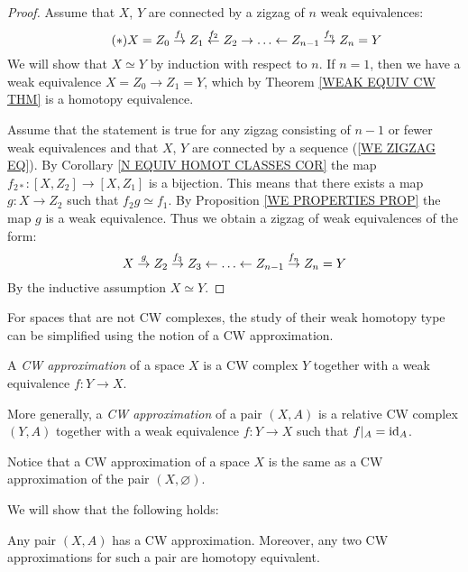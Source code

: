 \begin{proof}
Assume that $X$, $Y$ are connected by a zigzag of $n$ weak equivalences:
\begin{equation*}
\label{WE ZIGZAG EQ}
\tag{$\ast$}
X = Z_{0} \overset{f_{1}}{\ra} Z_{1} 
\overset{f_{2}}{\la} Z_{2} \ra \dots 
\la Z_{n-1} \overset{f_{n}}{\ra} Z_{n} = Y
\end{equation*}
We will show that $X\simeq Y$ by induction with respect to $n$. 
If $n=1$, then we have a weak equivalence $X=Z_{0} \to Z_{1} = Y$, which 
by Theorem \ref{WEAK EQUIV CW THM} is a homotopy equivalence. 

Assume that the statement is true for any zigzag consisting of $n-1$ or fewer weak 
equivalences and that $X$, $Y$ are connected by a sequence (\ref{WE ZIGZAG EQ}). 
By Corollary \ref{N EQUIV HOMOT CLASSES COR}
the map $f_{2\ast}\colon [X, Z_{2}]\to [X, Z_{1}]$ is a bijection. This means
that there exists a map $g\colon X \to Z_{2}$ such that $f_{2}g \simeq f_{1}$.
By Proposition \ref{WE PROPERTIES PROP} the map $g$ is a weak equivalence. 
Thus we obtain a zigzag of weak equivalences of the form:
\[
X  \overset{g}{\ra} Z_{2} 
\overset{f_{3}}{\ra} Z_{3} \la \dots 
\la Z_{n-1} \overset{f_{n}}{\ra} Z_{n} = Y
\]
By the inductive assumption $X\simeq Y$.  
\end{proof}

For spaces that are not CW complexes, the study of their
weak homotopy type can be simplified using the notion of a CW approximation. 

\begin{definition}
\label{CW APPROX DEF}
A \emph{CW approximation} of a space $X$ is a CW complex $Y$ together with a 
weak equivalence $f\colon Y\to X$. 

More generally, a  \emph{CW approximation} of a pair $(X, A)$ is a relative 
CW complex $(Y, A)$ together with a weak equivalence $f\colon Y \to X$ such that 
$f|_{A} = \mathrm{id}_{A}$.  
\end{definition}

Notice that a CW approximation of a space $X$ is the same as 
a CW approximation of the pair $(X, \varnothing)$.

We will show that the following holds: 

\begin{theorem}
\label{CW APPROX THM}
Any pair $(X, A)$ has a CW approximation. Moreover, any two CW approximations 
for such a pair are homotopy equivalent.
\end{theorem}

